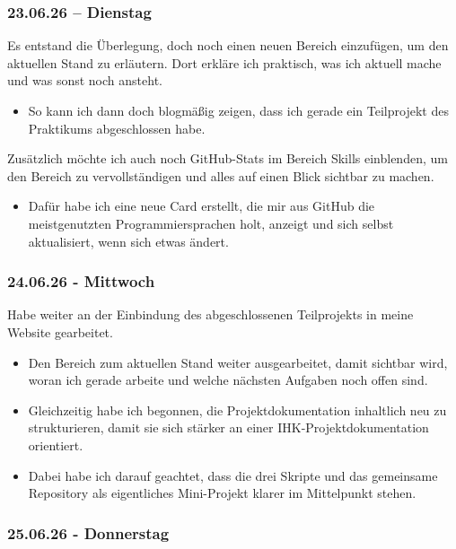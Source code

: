 \subsubsection{23.06.26 -- Dienstag}

Es entstand die Überlegung, doch noch einen neuen Bereich einzufügen, um den aktuellen Stand zu erläutern.
Dort erkläre ich praktisch, was ich aktuell mache und was sonst noch ansteht.

\begin{itemize}
    \item So kann ich dann doch blogmäßig zeigen, dass ich gerade ein Teilprojekt des Praktikums abgeschlossen habe.
\end{itemize}
Zusätzlich möchte ich auch noch GitHub-Stats im Bereich Skills einblenden, um den Bereich zu vervollständigen und alles auf einen Blick sichtbar zu machen.

\begin{itemize}
    \item Dafür habe ich eine neue Card erstellt, die mir aus GitHub die meistgenutzten Programmiersprachen holt, anzeigt und sich selbst aktualisiert, wenn sich etwas ändert.
\end{itemize}

\subsubsection{24.06.26 - Mittwoch}

Habe weiter an der Einbindung des abgeschlossenen Teilprojekts in meine Website gearbeitet.

\begin{itemize}
    \item Den Bereich zum aktuellen Stand weiter ausgearbeitet, damit sichtbar wird, woran ich gerade arbeite und welche nächsten Aufgaben noch offen sind.
    \item Gleichzeitig habe ich begonnen, die Projektdokumentation inhaltlich neu zu strukturieren, damit sie sich stärker an einer IHK-Projektdokumentation orientiert.
    \item Dabei habe ich darauf geachtet, dass die drei Skripte und das gemeinsame Repository als eigentliches Mini-Projekt klarer im Mittelpunkt stehen.
\end{itemize}

\subsubsection{25.06.26 - Donnerstag}

